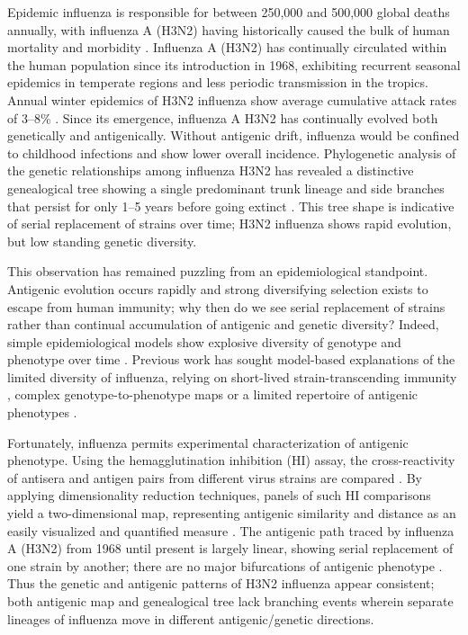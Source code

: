 \documentclass[11pt,oneside,letterpaper]{article}
\begin{document}
Epidemic influenza is responsible for between 250,000 and 500,000 global deaths annually, with influenza A (H3N2) having historically caused the bulk of human mortality and morbidity \cite{flufactsheet}.  Influenza A (H3N2) has continually circulated within the human population since its introduction in 1968, exhibiting recurrent seasonal epidemics in temperate regions and less periodic transmission in the tropics.  Annual winter epidemics of H3N2 influenza show average cumulative attack rates of 3--8\% \cite{Monto93,Koelle09}.  Since its emergence, influenza A H3N2 has continually evolved both genetically and antigenically.  Without antigenic drift, influenza would be confined to childhood infections and show lower overall incidence.  Phylogenetic analysis of the genetic relationships among influenza H3N2 has revealed a distinctive genealogical tree showing a single predominant trunk lineage and side branches that persist for only 1--5 years before going extinct \cite{Fitch97}.  This tree shape is indicative of serial replacement of strains over time; H3N2 influenza shows rapid evolution, but low standing genetic diversity.

This observation has remained puzzling from an epidemiological standpoint.  Antigenic evolution occurs rapidly and strong diversifying selection exists to escape from human immunity; why then do we see serial replacement of strains rather than continual accumulation of antigenic and genetic diversity?  Indeed, simple epidemiological models show explosive diversity of genotype and phenotype over time \cite{Ferguson03,Tria05}.  Previous work has sought model-based explanations of the limited diversity of influenza, relying on short-lived strain-transcending immunity \cite{Ferguson03,Tria05}, complex genotype-to-phenotype maps \cite{Koelle06} or a limited repertoire of antigenic phenotypes \cite{Recker07}. 

Fortunately, influenza permits experimental characterization of antigenic phenotype.  Using the hemagglutination inhibition (HI) assay, the cross-reactivity of antisera and antigen pairs from different virus strains are compared \cite{Hirst43}.  By applying dimensionality reduction techniques, panels of such HI comparisons yield a two-dimensional map, representing antigenic similarity and distance as an easily visualized and quantified measure \cite{Smith04}.  The antigenic path traced by influenza A (H3N2) from 1968 until present is largely linear, showing serial replacement of one strain by another; there are no major bifurcations of antigenic phenotype \cite{Smith04}.  Thus the genetic and antigenic patterns of H3N2 influenza appear consistent; both antigenic map and genealogical tree lack branching events wherein separate lineages of influenza move in different antigenic/genetic directions.
\end{document}
